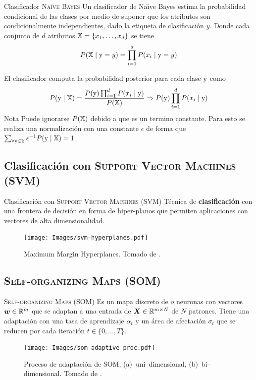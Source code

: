 \documentclass[10pt]{beamer}
\begin{document}
\begin{frame}{Clasificador \textsc{Na\"ive Bayes}}
  Un clasificador de Na\"{\i}ve Bayes estima la probabilidad condicional de las clases por medio de suponer que los atributos son condicionalmente independientes, dado la etiqueta de clasificación $y$. Donde cada conjunto de $d$ atributos ${\mathbb{X}}=\{ x_1, \ldots, x_d \}$ se tiene
  \begin{equation*}
    P({\mathbb{X}}\mid{\textnormal{y}}=y) = \prod_{i=1}^{d} P(x_i\mid{\textnormal{y}}=y)
  \end{equation*}

  El clasificador computa la probabilidad posterior para cada clase ${\textnormal{y}}$ como
  \begin{equation*}
    P({\textnormal{y}}\mid {\mathbb{X}}) = \frac{P({\textnormal{y}}) \prod_{i=1}^{d}P(x_i\mid{\textnormal{y}})}{P({\mathbb{X}})} \Rightarrow P({\textnormal{y}}) \prod_{i=1}^{d}P(x_i\mid{\textnormal{y}})
  \end{equation*}
  \alert{Nota} Puede ignorarse $P({\mathbb{X}})$ debido a que es un termino constante. Para esto se realiza una normalización con una constante $\epsilon$ de forma que $\sum_{\forall {\textnormal{y}} \in {\mathbb{Y}}} \epsilon^{-1} P({\textnormal{y}}\mid {\mathbb{X}}) = 1$.
\end{frame}

\subsection{Clasificación con \textsc{Support Vector Machines (SVM)}}
\begin{frame}{Clasificación con \textsc{Support Vector Machines (SVM)}}
  Técnica de \textbf{clasificación} con una frontera de decisión en forma de hiper-planos que permiten aplicaciones con vectores de alta dimensionalidad.
  \begin{figure}
    \centering
    \texttt{[image: Images/svm-hyperplanes.pdf]}
    \caption[Maximum Margin Hyperplanes]{Maximum Margin Hyperplanes. Tomado de \cite{tan2005introduction}.}
    \label{fig:svm-hyperplanes}
  \end{figure}
\end{frame}

\subsection{\textsc{Self-organizing Maps (SOM)}}
\begin{frame}{\textsc{Self-organizing Maps (SOM)}}
  Es un mapa discreto de $o$ neuronas con vectores ${\bm{w}} \in \mathbb{R}^m$ que se adaptan a una entrada de ${\bm{X}} \in \mathbb{R}^{m \times N}$ de $N$ patrones. Tiene una adaptación con una tasa de aprendizaje $\alpha_t$ y un área de afectación $\sigma_t$ que se reducen por cada iteración $t \in \{0, \ldots, T\}$.
  \begin{figure}
    \centering
    \texttt{[image: Images/som-adaptive-proc.pdf]}
    \caption[Proceso de adaptación de \textsc{SOM}]{Proceso de adaptación de \textsc{SOM}, (a)~uni--dimensional, (b)~bi--dimensional. Tomado de \cite{de2006fundamentals}.}
    \label{fig:som-adap-proc}
  \end{figure}
\end{frame}
\end{document}
